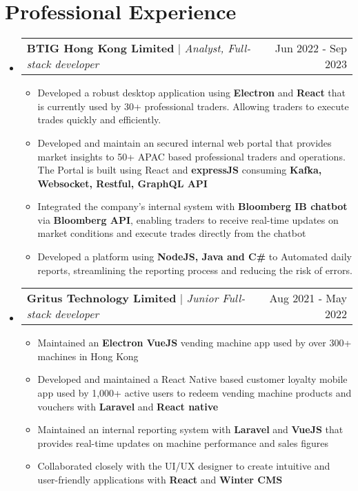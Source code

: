 \documentclass[letterpaper,11pt]{article}
\makeatletter
\newcommand{\resumeItem}[1]{
  \item\small{
    {#1 \vspace{-2pt}}
  }
}
\newcommand{\resumeProjectHeading}[2]{
    \item
    \begin{tabular*}{0.97\textwidth}{l@{\extracolsep{\fill}}r}
      \small#1 & #2 \\
    \end{tabular*}\vspace{-7pt}
}
\newcommand{\resumeSubHeadingListStart}{\begin{itemize}[leftmargin=0.15in, label={}]}
\newcommand{\resumeSubHeadingListEnd}{\end{itemize}}
\newcommand{\resumeItemListStart}{\begin{itemize}}
\newcommand{\resumeItemListEnd}{\end{itemize}\vspace{-5pt}}
\makeatother
\begin{document}
\section{Professional Experience}
  \resumeSubHeadingListStart

        \resumeProjectHeading
          {\textbf{BTIG Hong Kong Limited} $|$ \footnotesize\emph{Analyst, Full-stack developer}\vspace{8pt}}{Jun 2022 - Sep 2023}
        \resumeItemListStart
            \resumeItem{Developed a robust desktop application using \textbf{Electron} and \textbf{React} that is currently used by 30+ professional traders. Allowing traders to execute trades quickly and efficiently.}
            \resumeItem{Developed and maintain an secured internal web portal that provides market insights to 50+ APAC based professional traders and operations. The Portal is built using React and \textbf{expressJS} consuming \textbf{Kafka, Websocket, Restful, GraphQL API} }
            \resumeItem{Integrated the company's internal system with \textbf{Bloomberg IB chatbot} via \textbf{Bloomberg API}, enabling traders to receive real-time updates on market conditions and execute trades directly from the chatbot}
            \resumeItem{Developed a platform using \textbf{NodeJS, Java and C\#} to Automated daily reports, streamlining the reporting process and reducing the risk of errors.}
        \resumeItemListEnd

        \resumeProjectHeading
          {\textbf{Gritus Technology Limited}\vspace{8pt} $|$ \footnotesize\emph{Junior Full-stack developer}}{Aug 2021 - May 2022}
           \resumeItemListStart
            \resumeItem{Maintained an \textbf{Electron VueJS} vending machine app used by over 300+ machines in Hong Kong}
            \resumeItem{Developed and maintained a React Native based customer loyalty mobile app used by 1,000+ active users to redeem vending machine products and vouchers with \textbf{Laravel} and \textbf{React native}}
            \resumeItem{Maintained an internal reporting system with \textbf{Laravel} and \textbf{VueJS} that provides real-time updates on machine performance and sales figures}
            \resumeItem{Collaborated closely with the UI/UX designer to create intuitive and user-friendly applications with \textbf{React} and \textbf{Winter CMS}}
        \resumeItemListEnd
          
    \resumeSubHeadingListEnd 
\end{document}
